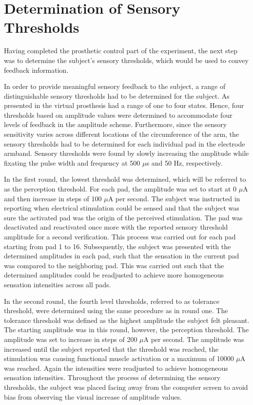 
\section{Determination of Sensory Thresholds}

Having completed the prosthetic control part of the experiment, the next step was to determine the subject's sensory thresholds, which would be used to convey feedback information.

In order to provide meaningful sensory feedback to the subject, a range of distinguishable sensory thresholds had to be determined for the subject. As presented in  the virtual prosthesis had a range of one to four states. Hence, four thresholds based on amplitude values were determined to accommodate four levels of feedback in the amplitude scheme. Furthermore, since the sensory sensitivity varies across different locations of the circumference of the arm, the sensory thresholds had to be determined for each individual pad in the electrode armband. Sensory thresholds were found by slowly increasing the amplitude while fixating the pulse width and frequency at 500 $\mu$s and 50 Hz, respectively. 

In the first round, the lowest threshold was determined, which will be referred to as the perception threshold. For each pad, the amplitude was set to start at 0 $\mu $A and then increase in steps of 100 $\mu$A per second. The subject was instructed in reporting when electrical stimulation could be sensed and that the subject was sure the activated pad was the origin of the perceived stimulation. The pad was deactivated and reactivated once more with the reported sensory threshold amplitude for a second verification. This process was carried out for each pad starting from pad 1 to 16. Subsequently, the subject was presented with the determined amplitudes in each pad, such that the sensation in the current pad was compared to the neighboring pad. This was carried out such that the determined amplitudes could be readjusted to achieve more homogeneous sensation intensities across all pads.  

In the second round, the fourth level thresholds, referred to as tolerance threshold, were determined using the same procedure as in round one. The tolerance threshold was defined as the highest amplitude the subject felt pleasant. The starting amplitude was in this round, however, the perception threshold. The amplitude was set to increase in steps of 200 $\mu$A per second. The amplitude was increased until the subject reported that the threshold was reached, the stimulation was causing functional muscle activation or a maximum of 10000 $\mu$A was reached. Again the intensities were readjusted to achieve homogeneous sensation intensities. Throughout the process of determining the sensory thresholds, the subject was placed facing away from the computer screen to avoid bias from observing the visual increase of amplitude values.  

